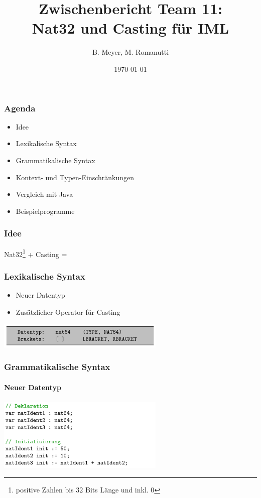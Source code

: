 \documentclass{beamer}
\title[Nat32 und Casting für IML]{Zwischenbericht Team 11: \protect\\ Nat32 und Casting für IML}
\author{B. Meyer, M. Romanutti}
\date{\today}
\institute{FHNW}
\begin{document}
    \begin{frame}[plain]
        \maketitle
    \end{frame}

    \begin{frame}
        \frametitle{Agenda}
        \begin{itemize}
            \item Idee
            \item Lexikalische Syntax
            \item Grammatikalische Syntax
            \item Kontext- und Typen-Einschränkungen
            \item Vergleich mit Java
            \item Beispielprogramme
        \end{itemize}

    \end{frame}

    \begin{frame}
        \frametitle{Idee}
        \centering
        Nat32\footnote{positive Zahlen bis 32 Bits Länge und inkl. 0} + Casting = \faRocket
    \end{frame}

    \begin{frame}
        \frametitle{Lexikalische Syntax}
        \begin{itemize}
            \item Neuer Datentyp
            \item Zusätzlicher Operator für Casting
        \end{itemize}
        \vspace{30}
        {\hspace{15}\includegraphics[width=8cm]{listing_1.png}}

    \end{frame}

    \begin{frame}
        \frametitle{Grammatikalische Syntax}
        \framesubtitle{Neuer Datentyp}
        {\includegraphics[width=8cm]{listing_2.png}}
    \end{frame}
\end{document}
